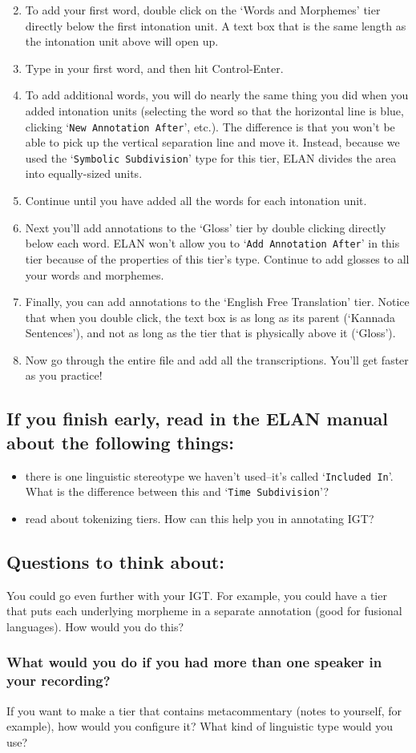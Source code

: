 \documentclass[letterpaper,12pt]{article}
\begin{document}
\begin{enumerate}
\setcounter{enumi}{1}
\item To add your first word, double click on the `Words and Morphemes' tier directly below the first intonation unit. A text box that is the same length as the intonation unit above will open up.
\item Type in your first word, and then hit Control-Enter.
\item To add additional words, you will do nearly the same thing you did when you added intonation units (selecting the word so that the horizontal line is blue, clicking `\texttt{New Annotation After}', etc.). The difference is that you won't be able to pick up the vertical separation line and move it. Instead, because we used the `\texttt{Symbolic Subdivision}' type for this tier, ELAN divides the area into equally-sized units.
\item Continue until you have added all the words for each intonation unit.
\item Next you'll add annotations to the `Gloss' tier by double clicking directly below each word. ELAN won't allow you to `\texttt{Add Annotation After}' in this tier because of the properties of this tier's type. Continue to add glosses to all your words and morphemes.
\item Finally, you can add annotations to the `English Free Translation' tier. Notice that when you double click, the text box is as long as its parent (`Kannada Sentences'), and not as long as the tier that is physically above it (`Gloss').
\item Now go through the entire file and add all the transcriptions. You'll get faster as you practice!
\end{enumerate}

\subsection*{If you finish early, read in the ELAN manual about the following things:}

\begin{itemize}
\item there is one linguistic stereotype we haven't used--it's called `\texttt{Included In}'. What is the difference between this and `\texttt{Time Subdivision}'?
\item read about tokenizing tiers. How can this help you in annotating IGT?
\end{itemize}

\subsection*{Questions to think about:}
You could go even further with your IGT. For example, you could have a tier that puts each underlying morpheme in a separate annotation (good for fusional languages). How would you do this?

\subsubsection*{What would you do if you had more than one speaker in your recording?}
If you want to make a tier that contains metacommentary (notes to yourself, for example), how would you configure it? What kind of linguistic type would you use?
\end{document}

